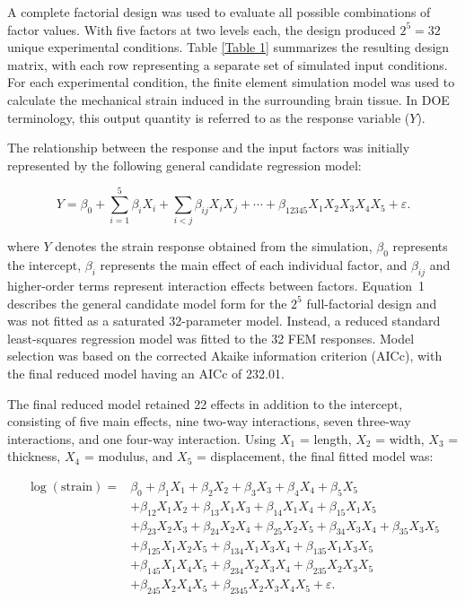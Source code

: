\documentclass[fleqn,10pt]{wlscirep}
\begin{document}
A complete factorial design was used to evaluate all possible combinations of factor values. With five factors at two levels each, the design produced $2^5 = 32$ unique experimental conditions. Table \ref{Table 1} summarizes the resulting design matrix, with each row representing a separate set of simulated input conditions. For each experimental condition, the finite element simulation model was used to calculate the mechanical strain induced in the surrounding brain tissue. In DOE terminology, this output quantity is referred to as the response variable ($Y$).

The relationship between the response and the input factors was initially represented by the following general candidate regression model:

\begin{equation}
Y=\beta_0+\sum_{i=1}^{5}\beta_iX_i+
\sum_{i<j}\beta_{ij}X_iX_j+\cdots+
\beta_{12345}X_1X_2X_3X_4X_5+\varepsilon .
\tag{1}
\end{equation}

where $Y$ denotes the strain response obtained from the simulation, $\beta_0$ represents the intercept, $\beta_i$ represents the main effect of each individual factor, and $\beta_{ij}$ and higher-order terms represent interaction effects between factors. Equation~1 describes the general candidate model form for the $2^5$ full-factorial design and was not fitted as a saturated 32-parameter model. Instead, a reduced standard least-squares regression model was fitted to the 32 FEM responses. Model selection was based on the corrected Akaike information criterion (AICc), with the final reduced model having an AICc of 232.01.

The final reduced model retained 22 effects in addition to the intercept, consisting of five main effects, nine two-way interactions, seven three-way interactions, and one four-way interaction. Using $X_1$ = length, $X_2$ = width, $X_3$ = thickness, $X_4$ = modulus, and $X_5$ = displacement, the final fitted model was:

\begin{equation}
\begin{aligned}
\log(\mathrm{strain}) ={}& \beta_0+\beta_1X_1+\beta_2X_2+\beta_3X_3+\beta_4X_4+\beta_5X_5\\&+\beta_{12}X_1X_2 +\beta_{13}X_1X_3 +\beta_{14}X_1X_4 +\beta_{15}X_1X_5\\&+\beta_{23}X_2X_3 +\beta_{24}X_2X_4 +\beta_{25}X_2X_5 +\beta_{34}X_3X_4 +\beta_{35}X_3X_5\\ &+\beta_{125}X_1X_2X_5 +\beta_{134}X_1X_3X_4 +\beta_{135}X_1X_3X_5\\&+\beta_{145}X_1X_4X_5 +\beta_{234}X_2X_3X_4 +\beta_{235}X_2X_3X_5\\ &+\beta_{245}X_2X_4X_5 +\beta_{2345}X_2X_3X_4X_5 +\varepsilon .
\end{aligned}
\tag{2}
\end{equation}
\end{document}
